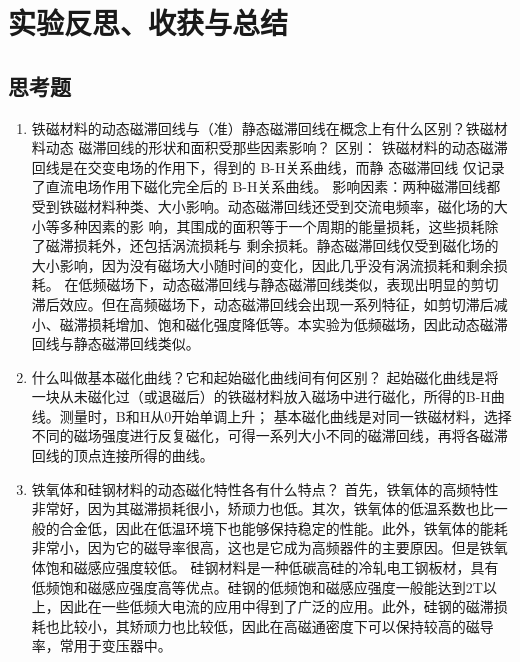 \documentclass[11pt]{article}
\begin{document}
\section{实验反思、收获与总结}
\subsection{思考题}
\begin{enumerate}
    \item 铁磁材料的动态磁滞回线与（准）静态磁滞回线在概念上有什么区别？铁磁材料动态
    磁滞回线的形状和面积受那些因素影响？
    \newline 区别：
    \newline \hspace*{2em}铁磁材料的动态磁滞回线是在交变电场的作用下，得到的 B-H关系曲线，而静
    态磁滞回线 仅记录了直流电场作用下磁化完全后的 B-H关系曲线。
    \newline \hspace*{2em}影响因素：两种磁滞回线都受到铁磁材料种类、大小影响。动态磁滞回线还受到交流电频率，磁化场的大小等多种因素的影
    响，其围成的面积等于一个周期的能量损耗，这些损耗除了磁滞损耗外，还包括涡流损耗与
    剩余损耗。静态磁滞回线仅受到磁化场的大小影响，因为没有磁场大小随时间的变化，因此几乎没有涡流损耗和剩余损耗。
    \newline \hspace*{2em}在低频磁场下，动态磁滞回线与静态磁滞回线类似，表现出明显的剪切滞后效应。但在高频磁场下，动态磁滞回线会出现一系列特征，如剪切滞后减小、磁滞损耗增加、饱和磁化强度降低等。本实验为低频磁场，因此动态磁滞回线与静态磁滞回线类似。
    \item 什么叫做基本磁化曲线？它和起始磁化曲线间有何区别？
    \newline \hspace*{2em}起始磁化曲线是将一块从未磁化过（或退磁后）的铁磁材料放入磁场中进行磁化，所得的B-H曲线。测量时，B和H从0开始单调上升；
    基本磁化曲线是对同一铁磁材料，选择不同的磁场强度进行反复磁化，可得一系列大小不同的磁滞回线，再将各磁滞回线的顶点连接所得的曲线。
    \item 铁氧体和硅钢材料的动态磁化特性各有什么特点？
    \newline \hspace*{2em} 首先，铁氧体的高频特性非常好，因为其磁滞损耗很小，矫顽力也低。其次，铁氧体的低温系数也比一般的合金低，因此在低温环境下也能够保持稳定的性能。此外，铁氧体的能耗非常小，因为它的磁导率很高，这也是它成为高频器件的主要原因。但是铁氧体饱和磁感应强度较低。
    \newline \hspace*{2em}硅钢材料是一种低碳高硅的冷轧电工钢板材，具有低频饱和磁感应强度高等优点。硅钢的低频饱和磁感应强度一般能达到2T以上，因此在一些低频大电流的应用中得到了广泛的应用。此外，硅钢的磁滞损耗也比较小，其矫顽力也比较低，因此在高磁通密度下可以保持较高的磁导率，常用于变压器中。

\end{enumerate}
\end{document}
